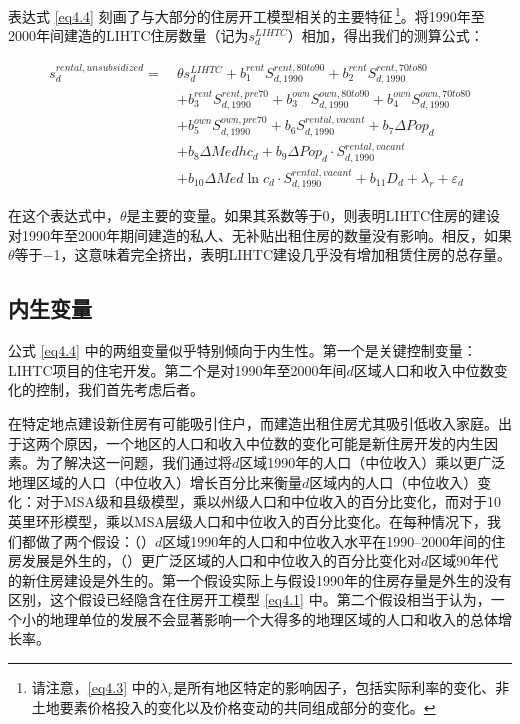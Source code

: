 \documentclass[lang=cn,11pt,a4paper]{paper}
\begin{document}
表达式 \eqref{eq4.4} 刻画了与大部分的住房开工模型相关的主要特征\,\footnote{请注意，\eqref{eq4.3} 中的$\lambda_{r}$是所有地区特定的影响因子，包括实际利率的变化、非土地要素价格投入的变化以及价格变动的共同组成部分的变化。}。将1990年至2000年间建造的LIHTC住房数量（记为$s_d^{LIHTC}$）相加，得出我们的测算公式：

\begin{equation}\label{eq4.5}
  \begin{aligned}
    s_{d}^{rental,unsubsidized}=\ & \theta s_{d}^{LIHTC}+b_{1}^{rent} S_{d, 1990}^{rent, 80 to 90}+b_{2}^{rent} S_{d, 1990}^{rent, 70 t o 80} \\
    &+b_{3}^{rent } S_{d, 1990}^{rent , pre 70}+b_{3}^{own} S_{d, 1990}^{own, 80 to90}+b_{4}^{own } S_{d, 1990}^{own, 70 to 80} \\
    &+b_{5}^{own} S_{d, 1990}^{own,pre70}+b_{6} S_{d, 1990}^{rental,vacant}+b_{7} \Delta P o p_{d} \\
    &+b_{8} \Delta M e d h c_{d}+b_{9} \Delta P o p_{d} \cdot S_{d, 1990}^{rental, vacant} \\
    &+b_{10} \Delta M e d \ln c_{d} \cdot S_{d, 1990}^{rental, vacant}+b_{11} D_{d}+\lambda_{r}+\varepsilon_{d}
    \end{aligned}
\end{equation}
\vspace{2pt}

在这个表达式中，$\theta$是主要的变量。如果其系数等于0，则表明LIHTC住房的建设对1990年至2000年期间建造的私人、无补贴出租住房的数量没有影响。相反，如果$\theta$等于$-$1，这意味着完全挤出，表明LIHTC建设几乎没有增加租赁住房的总存量。

\subsection{内生变量}

公式 \eqref{eq4.4} 中的两组变量似乎特别倾向于内生性。第一个是关键控制变量：LIHTC项目的住宅开发。第二个是对1990年至2000年间$d$区域人口和收入中位数变化的控制，我们首先考虑后者。

在特定地点建设新住房有可能吸引住户，而建造出租住房尤其吸引低收入家庭。出于这两个原因，一个地区的人口和收入中位数的变化可能是新住房开发的内生因素。为了解决这一问题，我们通过将$d$区域1990年的人口（中位收入）乘以更广泛地理区域的人口（中位收入）增长百分比来衡量$d$区域内的人口（中位收入）变化：对于MSA级和县级模型，乘以州级人口和中位收入的百分比变化，而对于10英里环形模型，乘以MSA层级人口和中位收入的百分比变化。在每种情况下，我们都做了两个假设：（）$d$区域1990年的人口和中位收入水平在1990--2000年间的住房发展是外生的，（）更广泛区域的人口和中位收入的百分比变化对$d$区域90年代的新住房建设是外生的。第一个假设实际上与假设1990年的住房存量是外生的没有区别，这个假设已经隐含在住房开工模型 \eqref{eq4.1} 中。第二个假设相当于认为，一个小的地理单位的发展不会显著影响一个大得多的地理区域的人口和收入的总体增长率。
\end{document}
